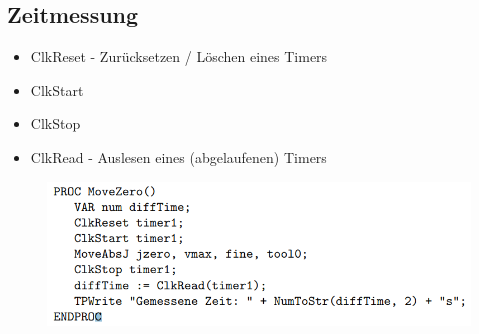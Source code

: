 \subsection{Zeitmessung}
\begin{itemize}
	\item ClkReset - Zurücksetzen / Löschen eines Timers
	\item ClkStart
	\item ClkStop
	\item ClkRead - Auslesen eines (abgelaufenen) Timers
\end{itemize}
\begin{figure}[]
	\begin{center}
		\includegraphics[]{resources/PNG/code1.PNG}
		\caption{}
		\label{fig:resources/PNG/code1.PNG}
	\end{center}
\end{figure}
